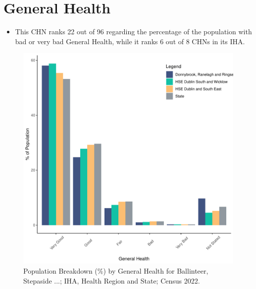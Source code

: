 \documentclass{article}
\begin{document}
\pagebreak

\section{General Health}\label{sect:GenHealth}
\begin{itemize}
\item  This CHN ranks  22 out of 96 regarding the percentage of the population with bad or very bad General Health, while it ranks   6 out of 8 CHNs in its IHA.
\end{itemize}
\begin{figure}[h]
	\centering
	\includegraphics[width = 150mm]{../figures/GenED.pdf}
	\caption{Population Breakdown (\%) by General Health for Ballinteer, Stepaside ...; IHA, Health Region and State;  Census 2022.}
	\label{fig:2ae19629-1a6a-13a3-e055-000000000001}
	\end{figure}
\end{document}
